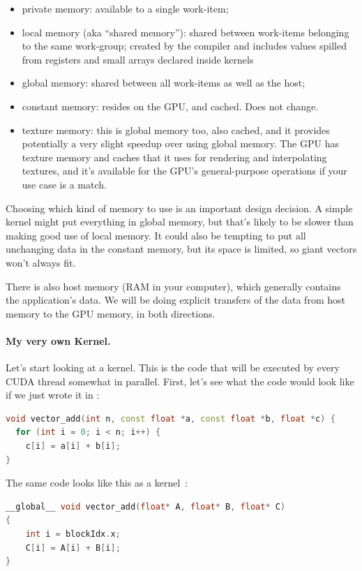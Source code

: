 \begin{itemize}
\item private memory: available to a single work-item;
\item local memory (aka ``shared memory''): shared between work-items
  belonging to the same work-group; created by the compiler and includes values spilled from registers and small arrays declared inside kernels~\cite{micikevicius11:_local_memor_regis_spill}
\item global memory: shared between all work-items as well as the host;
\item constant memory: resides on the GPU, and cached. Does not change.
\item texture memory: this is global memory too, also cached, and it provides potentially a very slight speedup over using global memory. The GPU has texture memory and caches that it uses for rendering and interpolating textures, and it's available for the GPU's general-purpose operations if your use case is a match. 
\end{itemize}

Choosing which kind of memory to use is an important design decision. A simple kernel might put everything in global memory, but that's likely to be slower than making good use of local memory. It could also be tempting to put all unchanging data in the constant memory, but its space is limited, so giant vectors won't always fit.

There is also host memory (RAM in your computer), which generally contains the application's data. We will be doing explicit transfers of the data from host memory to the GPU memory, in both directions.

\paragraph{My very own Kernel.} Let's start looking at a kernel. This is the code that will be executed by every CUDA thread somewhat in parallel. First, let's see what the code would look like if we just wrote it in \CPP:

\begin{lstlisting}[language=C++]
void vector_add(int n, const float *a, const float *b, float *c) {
  for (int i = 0; i < n; i++) {
    c[i] = a[i] + b[i];
}
\end{lstlisting}


The same code looks like this as a kernel~\cite{cuda}:
\begin{lstlisting}[language=C++]
__global__ void vector_add(float* A, float* B, float* C)
{
    int i = blockIdx.x;
    C[i] = A[i] + B[i];
}
\end{lstlisting}

